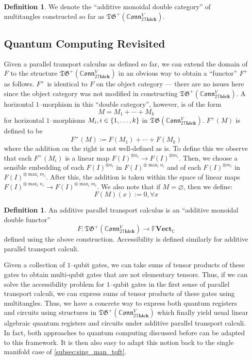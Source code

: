 \documentclass{amsart}
\newcommand{\C}{\mathbb{C}}
\newcommand{\tensor}{\otimes}
\renewcommand{\to}[1][]{\stackrel{#1}{\longrightarrow}}
\newcommand{\br}[1]{\left( #1 \right)}
\newcommand{\curly}[1]{\left\{ #1 \right\}}
\newcommand{\set}[2][]{\ifthenelse{\equal{#1}{}}
                                  {\curly{#2}}
                                  {\curly{#1\ \textbf{:}\ #2}}}
\newcommand{\FFVect}{\mathbb{F}\textbf{Vect}}
\newcommand{\DThick}{2\mathbb{T}\mathbf{hick}}
\newcommand{\TG}{\mathfrak{TG}}
\newcommand{\CConn}{\mathbb{C}\mathfrak{onn}}
\numberwithin{thm}{section}
\theoremstyle{definition}
\newtheorem{defn}[thm]{Definition}
\begin{document}
\begin{defn}
We denote the ``additive monoidal double category'' of multitangles constructed
so far as $\TG^+(\CConn^V_{\DThick})$.
\end{defn}

%

\subsection{Quantum Computing Revisited}

Given a parallel transport calculus as defined so far, we can extend the domain of
$F$ to the structure $\TG^+\br{\CConn^V_{\DThick}}$ in an obvious way to obtain
a ``functor'' $F^+$ as follows. $F^+$ is identical to $F$ on the object category
--- there are no issues here since the object category was not modified in
constructing $\TG^+\br{\CConn^V_{\DThick}}$. A horizontal $1$--morphism in this
``double category'', however, is of the form
\[
  M = M_1 + \cdots + M_k
\]
for horizontal $1$--morphisms $M_i, i \in \set{1, \dots, k}$ in
$\TG\br{\CConn^V_{\DThick}}$. $F^+(M)$ is defined to be
\[
  F^+(M) := F(M_1) + \cdots + F(M_k)
\]
where the addition on the right is not well-defined as is. To define this we
observe that each $F^+(M_i)$ is a linear map
$F(I)^{\tensor n_i} \to F(I)^{\tensor m_i}$. Then, we choose a sensible
embedding of each $F(I)^{\tensor n_i}$ in $F(I)^{\tensor \max_i n_i}$ and of
each $F(I)^{\tensor m_i}$ in $F(I)^{\tensor \max_i m_i}$. After this, the
addition is taken within the space of linear maps
$F(I)^{\tensor \max_i n_i} \to F(I)^{\tensor \max_i m_i}$. We also note that if
$M = \varnothing$, then we define:
\[
  F(M)(x) := 0, \forall x
\]

\begin{defn}
An additive parallel transport calculus is an ``additive monoidal double functor''
\[
  F : \TG^+(\CConn^V_{\DThick}) \to \FFVect_{\C}
\]
defined using the above construction.
Accessibility is defined similarly for additive parallel transport calculi.
\end{defn}

Given a collection of $1$--qubit gates, we can take sums of tensor products of
these gates to obtain multi-qubit gates that are not elementary tensors.  Thus,
if we can solve the accessibility problem for $1$--qubit gates in the first
sense of parallel transport calculi, we can express sums of tensor products of
these gates using multitangles. Thus, we have a concrete way to express both
quantum registers and circuits using structures in $\TG^+(\CConn^V_{\DThick})$
which finally yield usual linear algebraic quantum registers and circuits under
additive parallel transport calculi. In fact, both approaches to quantum
computing discussed before can be adapted to this framework. It is then also
easy to adapt this notion back to the single manifold case of
\ref{subsec:sing_man_tqft}.
\end{document}
